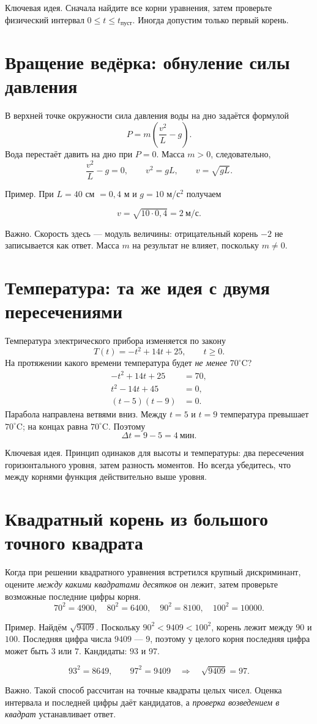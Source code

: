 \documentclass[a4paper,11pt]{article}
\newcommand{\keyword}[1]{\textcolor{darkaccent}{#1}}
\newcommand{\idea}[1]{\par\noindent\keyword{Ключевая идея.} #1\par}
\newcommand{\example}[1]{\par\noindent\keyword{Пример.} #1\par}
\newcommand{\caution}[1]{\par\noindent\textcolor{darkaccent}{Важно.} #1\par}
\begin{document}
\idea{Сначала найдите все корни уравнения, затем проверьте физический интервал $0\le t\le t_{\text{пуст}}$. Иногда допустим только первый корень.}

\section{Вращение ведёрка: обнуление силы давления}
В верхней точке окружности сила давления воды на дно задаётся формулой
\[
P=m\left(\frac{v^2}{L}-g\right).
\]
Вода перестаёт давить на дно при $P=0$. Масса $m>0$, следовательно,
\[
 \frac{v^2}{L}-g=0,\qquad v^2=gL,\qquad
 \boxed{v=\sqrt{gL}}.
\]
\example{При $L=40$ см $=0{,}4$ м и $g=10$ м/с$^2$ получаем}
\[
v=\sqrt{10\cdot0{,}4}=\boxed{2\ \text{м/с}}.
\]
\caution{Скорость здесь --- модуль величины: отрицательный корень $-2$ не записывается как ответ. Масса $m$ на результат не влияет, поскольку $m\ne0$.}
\clearpage

\section{Температура: та же идея с двумя пересечениями}
Температура электрического прибора изменяется по закону
\[
T(t)=-t^2+14t+25,\qquad t\ge0.
\]
На протяжении какого времени температура будет \emph{не менее} $70^\circ\mathrm C$?
\[
\begin{aligned}
 -t^2+14t+25&=70,\\
 t^2-14t+45&=0,\\
 (t-5)(t-9)&=0.
\end{aligned}
\]
Парабола направлена ветвями вниз. Между $t=5$ и $t=9$ температура превышает $70^\circ\mathrm C$; на концах равна $70^\circ\mathrm C$. Поэтому
\[
\boxed{\Delta t=9-5=4\ \text{мин}}.
\]
\idea{Принцип одинаков для высоты и температуры: два пересечения горизонтального уровня, затем разность моментов. Но всегда убедитесь, что между корнями функция действительно выше уровня.}

\section{Квадратный корень из большого точного квадрата}
Когда при решении квадратного уравнения встретился крупный дискриминант, оцените \emph{между какими квадратами десятков} он лежит, затем проверьте возможные последние цифры корня.
\[
 70^2=4900,\quad 80^2=6400,\quad 90^2=8100,\quad100^2=10000.
\]
\example{Найдём $\sqrt{9409}$. Поскольку $90^2<9409<100^2$, корень лежит между $90$ и $100$. Последняя цифра числа $9409$ --- $9$, поэтому у целого корня последняя цифра может быть $3$ или $7$. Кандидаты: $93$ и $97$.}
\[
93^2=8649,\qquad97^2=9409\quad\Longrightarrow\quad
\boxed{\sqrt{9409}=97}.
\]
\caution{Такой способ рассчитан на точные квадраты целых чисел. Оценка интервала и последней цифры даёт кандидатов, а \emph{проверка возведением в квадрат} устанавливает ответ.}
\end{document}
